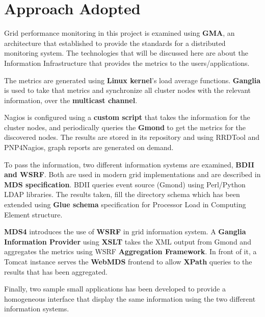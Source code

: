 \section{Approach Adopted}

Grid performance monitoring in this project is examined using {\bf GMA}, an architecture that established to provide the standards for a distributed monitoring system. The technologies that will be discussed here are about the Information Infrastructure that provides the metrics to the users/applications.

The metrics are generated using {\bf Linux kernel}'s load average functions. {\bf Ganglia} is used to take that metrics and synchronize all cluster nodes with the relevant information, over the {\bf multicast channel}.

Nagios is configured using a {\bf custom script} that takes the information for the cluster nodes, and periodically queries the {\bf Gmond} to get the metrics for the discovered nodes. The results are stored in its repository and using RRDTool and PNP4Nagios, graph reports are generated on demand.

To pass the information, two different information systems are examined, {\bf BDII and WSRF}. Both are used in modern grid implementations and are described in {\bf MDS specification}. BDII queries event source (Gmond) using Perl/Python LDAP libraries. The results taken, fill the directory schema which has been extended using {\bf Glue schema} specification for Processor Load in Computing Element structure.

{\bf MDS4} introduces the use of {\bf WSRF} in grid information system. A {\bf Ganglia Information Provider} using {\bf XSLT} takes the XML output from Gmond and aggregates the metrics using WSRF {\bf Aggregation Framework}. In front of it, a Tomcat instance serves the {\bf WebMDS} frontend to allow {\bf XPath} queries to the results that has been aggregated.

Finally, two sample small applications has been developed to provide a homogeneous interface that display the same information using the two different information systems.

